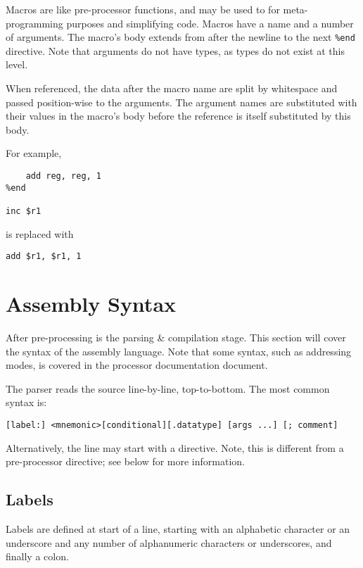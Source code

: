 \documentclass[10pt]{article}
\begin{document}
Macros are like pre-processor functions, and may be used to for meta-programming purposes and simplifying code.
Macros have a name and a number of arguments.
The macro's body extends from after the newline to the next \texttt{\%end} directive.
Note that arguments do not have types, as types do not exist at this level.

When referenced, the data after the macro name are split by whitespace and passed position-wise to the arguments.
The argument names are substituted with their values in the macro's body before the reference is itself substituted by this body.

For example,

\begin{lstlisting}[style=assembly]
%macro inc reg
    add reg, reg, 1
%end

inc $r1
\end{lstlisting}

is replaced with

\begin{lstlisting}[style=assembly]
add $r1, $r1, 1
\end{lstlisting}

\section{Assembly Syntax}

After pre-processing is the parsing \& compilation stage.
This section will cover the syntax of the assembly language.
Note that some syntax, such as addressing modes, is covered in the processor documentation document.

The parser reads the source line-by-line, top-to-bottom.
The most common syntax is:

\begin{lstlisting}[style=assembly]
[label:] <mnemonic>[conditional][.datatype] [args ...] [; comment]
\end{lstlisting}

Alternatively, the line may start with a directive.
Note, this is different from a pre-processor directive; see below for more information.

\subsection{Labels}

Labels are defined at start of a line, starting with an alphabetic character or an underscore and any number of alphanumeric characters or underscores, and finally a colon.
\end{document}
